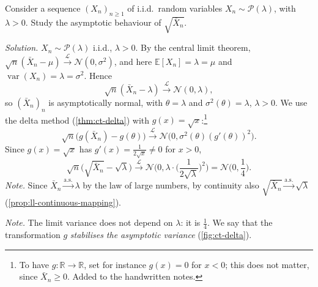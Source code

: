 \begin{example}\label{exa:ct-sqrt-poisson}
Consider a sequence $(X_n)_{n\ge1}$ of i.i.d.\ random variables $X_n\sim\mathcal P(\lambda)$, with
$\lambda>0$. Study the asymptotic behaviour of $\sqrt{\bar X_n}$.

\emph{Solution.} $X_n\sim\mathcal P(\lambda)$ i.i.d., $\lambda>0$. By the central limit theorem,
$\sqrt n(\bar X_n-\mu)\xrightarrow{\mathcal L}\mathcal N(0,\sigma^2)$, and here
$\mathbb E[X_n]=\lambda=\mu$ and $\operatorname{var}(X_n)=\lambda=\sigma^2$. Hence
\[
  \sqrt n(\bar X_n-\lambda)\xrightarrow{\mathcal L}\mathcal N(0,\lambda),
\]
so $(\bar X_n)_n$ is asymptotically normal, with $\theta=\lambda$ and $\sigma^2(\theta)=\lambda$,
$\lambda>0$. We use the delta method (\cref{thm:ct-delta}) with $g(x)=\sqrt x$:\footnote{To have
$g:\mathbb R\to\mathbb R$, set for instance $g(x)=0$ for $x<0$; this does not matter, since
$\bar X_n\ge0$. Added to the handwritten notes.}
\[
  \sqrt n\big(g(\bar X_n)-g(\theta)\big)\xrightarrow{\mathcal L}\mathcal N\big(0,\sigma^2(\theta)(g'(\theta))^2\big).
\]
Since $g(x)=\sqrt x$ has $g'(x)=\frac1{2\sqrt x}\ne0$ for $x>0$,
\[
  \sqrt n\big(\sqrt{\bar X_n}-\sqrt\lambda\big)\xrightarrow{\mathcal L}
  \mathcal N\Big(0,\lambda\cdot\Big(\frac1{2\sqrt\lambda}\Big)^2\Big)=\mathcal N\Big(0,\frac14\Big).
\]
\emph{Note.} Since $\bar X_n\xrightarrow{\text{a.s.}}\lambda$ by the law of large numbers, by continuity also
$\sqrt{\bar X_n}\xrightarrow{\text{a.s.}}\sqrt\lambda$ (\cref{prop:ll-continuous-mapping}).

\emph{Note.} The limit variance does not depend on $\lambda$: it is $\frac14$. We say that the
transformation $g$ \emph{stabilises the asymptotic variance} (\cref{fig:ct-delta}).
\end{example}

